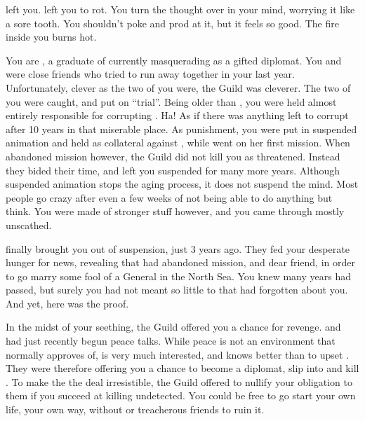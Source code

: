 \documentclass[char]{NeptuneBall}
\begin{document}
\name{\cDiplomat{}}


\cQueen{\They} left you. \cQueen{\They} left you to rot. You turn the thought over in your mind, worrying it like a sore tooth. You shouldn't poke and prod at it, but it feels so good. The fire inside you burns hot.

You are \cDiplomat{}, a graduate of \pAssassin{} currently masquerading as a gifted diplomat. You and \cQueen{} were close friends who tried to run away together in your last year. Unfortunately, clever as the two of you were, the Guild was cleverer. The two of you were caught, and put on ``trial''. Being older than \cQueen{}, you were held almost entirely responsible for corrupting \cQueen{\them}. Ha! As if there was anything left to corrupt after 10 years in that miserable place. As punishment, you were put in suspended animation and held as collateral against \cQueen{}, while \cQueen{\they} went on her first mission. When \cQueen{} abandoned \cQueen{\them} mission however, the Guild did not kill you as threatened. Instead they bided their time, and left you suspended for many more years. Although suspended animation stops the aging process, it does not suspend the mind. Most people go crazy after even a few weeks of not being able to do anything but think. You were made of stronger stuff however, and you came through mostly unscathed.

\pAssassin{} finally brought you out of suspension, just 3 years ago. They fed your desperate hunger for news, revealing that \cQueen{} had abandoned \cQueen{\them} mission, and \cQueen{\them} dear friend, in order to go marry some fool of a General in the North Sea. You knew many years had passed, but surely you had not meant so little to \cQueen{} that \cQueen{\they} had forgotten about you. And yet, here was the proof.  

In the midst of your seething, the Guild offered you a chance for revenge.  \pAtlantis{} and \pPacifica{} had just recently begun peace talks. While peace is not an environment that \pAssassin{} normally approves of, \cPacificanRuler{\King} \cPacificanRuler{} is very much interested, and \pAssassin{} knows better than to upset \cPacificanRuler{\them}. They were therefore offering you a chance to become a diplomat, slip into \pAtlantis{} and kill \cQueen{}. To make the the deal irresistible, the Guild offered to nullify your obligation to them if you succeed at killing \cQueen{\them} undetected. You could be free to go start your own life, your own way, without \pAssassin{} or treacherous friends to ruin it.
\end{document}
